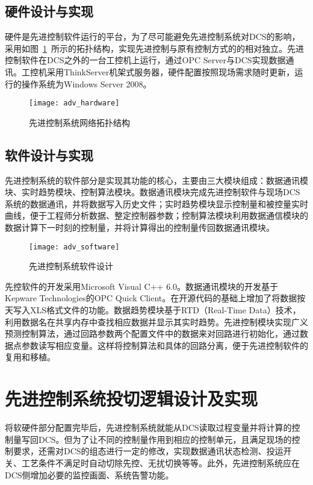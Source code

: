 \subsection{硬件设计与实现}
硬件是先进控制软件运行的平台，为了尽可能避免先进控制系统对DCS的影响，采用如图~\ref{fig:adv_hardware}~所示的拓扑结构，实现先进控制与原有控制方式的的相对独立。先进控制软件在DCS之外的一台工控机上运行，通过OPC Server与DCS实现数据通讯。工控机采用ThinkServer机架式服务器，硬件配置按照现场需求随时更新，运行的操作系统为Windows Server 2008。
\begin{figure}[!hbt]
\centering
\texttt{[image: adv\_hardware]}
\caption{先进控制系统网络拓扑结构} \label{fig:adv_hardware}
\end{figure}
 
\subsection{软件设计与实现}
先进控制系统的软件部分是实现其功能的核心，主要由三大模块组成：数据通讯模块、实时趋势模块、控制算法模块。数据通讯模块完成先进控制软件与现场DCS系统的数据通讯，并将数据写入历史文件；实时趋势模块显示控制量和被控量实时曲线，便于工程师分析数据、整定控制器参数；控制算法模块利用数据通信模块的数据计算下一时刻的控制量，并将计算得出的控制量传回数据通讯模块。
\begin{figure}[!hbt]
\centering
\texttt{[image: adv\_software]}
\caption{先进控制系统软件设计} \label{fig:adv_software}
\end{figure}

先控软件的开发采用Microsoft Visual C++ 6.0。数据通讯模块的开发基于Kepware Technologies的OPC Quick Client。在开源代码的基础上增加了将数据按天写入XLS格式文件的功能。数据趋势模块基于RTD（Real-Time Data）技术，利用数据名在共享内存中查找相应数据并显示其实时趋势。先进控制模块实现广义预测控制算法，通过回路参数两个配置文件中的数据来对回路进行初始化，通过数据点参数读写相应变量。这样将控制算法和具体的回路分离，便于先进控制软件的复用和移植。

\section{先进控制系统投切逻辑设计及实现}
将软硬件部分配置完毕后，先进控制系统就能从DCS读取过程变量并将计算的控制量写回DCS。但为了让不同的控制量作用到相应的控制单元，且满足现场的控制要求，还需对DCS的组态进行一定的修改，实现数据通讯状态检测、投运开关、工艺条件不满足时自动切除先控、无扰切换等等。此外，先进控制系统应在DCS侧增加必要的监控画面、系统告警功能。


